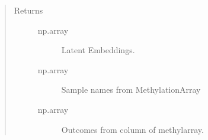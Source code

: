 \documentclass[letterpaper,10pt,english]{sphinxmanual}
\begin{document}
\begin{fulllineitems}
\begin{fulllineitems}
\begin{quote}
\begin{description}
\begin{description}
\end{description}

\item[{Returns}] \leavevmode\begin{description}
\item[{np.array}] \leavevmode
Latent Embeddings.

\item[{np.array}] \leavevmode
Sample names from MethylationArray

\item[{np.array}] \leavevmode
Outcomes from column of methylarray.

\end{description}

\end{description}\end{quote}

\end{fulllineitems}


\end{fulllineitems}

\end{document}
